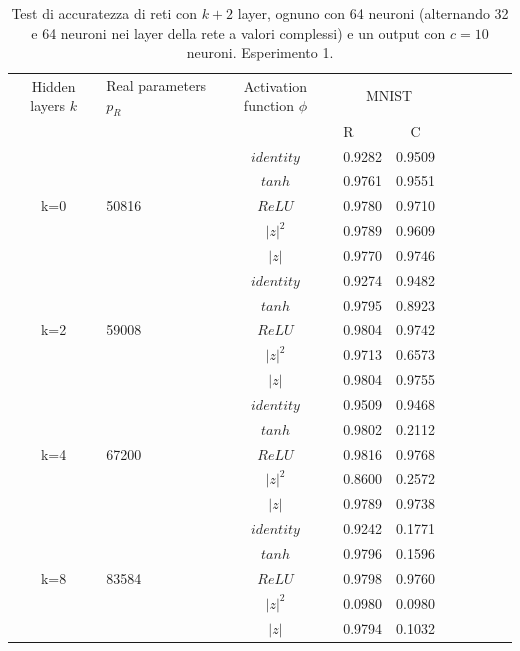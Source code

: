 \documentclass[a4paper,10pt]{article}
\begin{document}
 \begin{table}
  \centering
  \begin{tabular}{cp{} cp{}   cp{} cp{} cp{}}
   \cline{1-5}
   Hidden layers $k$ & Real parameters $p_R$ & Activation function $\phi$ & \multicolumn{2}{c}{MNIST}\\
   \cline{4-5}
   & & & R & C \\
   \cline{1-5}
   & & $identity$ & 0.9282 & 0.9509 \\
   \cline{3-5}
   & & $tanh$ & 0.9761 & 0.9551 \\
   \cline{3-5}
   k=0 & 50816 & $ReLU$ & 0.9780 & 0.9710 \\
   \cline{3-5}
   & & $|z|^2$ & 0.9789 & 0.9609 \\
   \cline{3-5}
   & & $|z|$ & 0.9770 & 0.9746 \\
   \cline{1-5}
  
   & & $identity$ & 0.9274 & 0.9482 \\
   \cline{3-5}
   & & $tanh$ & 0.9795 & 0.8923 \\
   \cline{3-5}
   k=2 & 59008 & $ReLU$ & 0.9804 & 0.9742 \\
   \cline{3-5}
   & & $|z|^2$ & 0.9713 & 0.6573 \\
   \cline{3-5}
   & & $|z|$ & 0.9804 & 0.9755 \\
   \cline{1-5}
  
   & & $identity$ & 0.9509 & 0.9468 \\
   \cline{3-5}
   & & $tanh$ & 0.9802 & 0.2112 \\
   \cline{3-5}
   k=4 & 67200 & $ReLU$ & 0.9816 & 0.9768 \\
   \cline{3-5}
   & & $|z|^2$ & 0.8600 & 0.2572 \\
   \cline{3-5}
   & & $|z|$ & 0.9789 & 0.9738 \\
   \cline{1-5}
   
   & & $identity$ & 0.9242 & 0.1771 \\
   \cline{3-5}
   & & $tanh$ & 0.9796 & 0.1596 \\
   \cline{3-5}
   k=8 & 83584 & $ReLU$ & 0.9798 & 0.9760 \\
   \cline{3-5}
   & & $|z|^2$ & 0.0980 & 0.0980 \\
   \cline{3-5}
   & & $|z|$ & 0.9794 & 0.1032 \\
   \cline{1-5}
  \end{tabular}
  \caption{Test di accuratezza di reti con $k+2$ layer, ognuno con 64 neuroni (alternando 32 e 64 neuroni nei layer della rete a valori complessi) e un output con $c=10$ neuroni. Esperimento 1.}
  \label{MNIST1Tab}
 \end{table}
 
\end{document}
